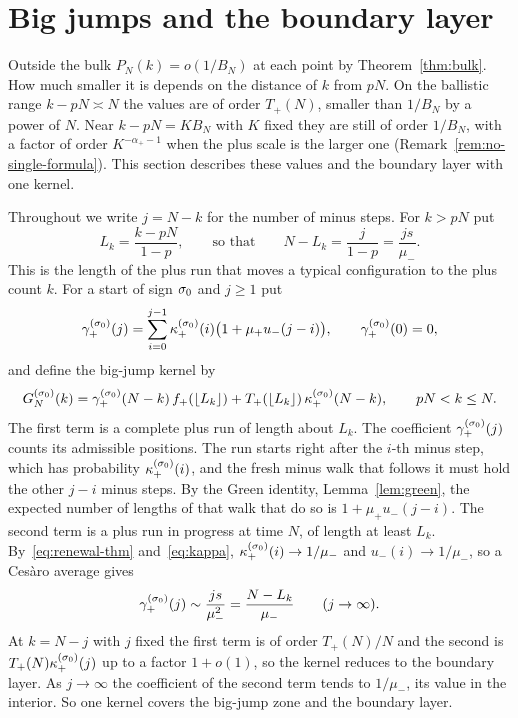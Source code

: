 \section{Big jumps and the boundary layer}\label{sec:bigjump}

Outside the bulk $P_N(k)=o(1/B_N)$ at each point by Theorem~\ref{thm:bulk}. How
much smaller it is depends on the distance of $k$ from $pN$. On the ballistic
range $k-pN\asymp N$ the values are of order $T_\plus(N)$, smaller than $1/B_N$
by a power of $N$. Near $k-pN=KB_N$ with $K$ fixed they are still of order
$1/B_N$, with a factor of order $K^{-\alpha_\plus-1}$ when the plus scale is the
larger one (Remark~\ref{rem:no-single-formula}). This section describes these
values and the
boundary layer with one kernel.

Throughout we write $j=N-k$ for the number of minus steps. For $k>pN$ put
\begin{equation}\label{eq:Lk}
 L_k=\frac{k-pN}{1-p},\qquad\text{so that}\qquad N-L_k=\frac{j}{1-p}=\frac{js}{\mu_\minus}.
\end{equation}
This is the length of the plus run that moves a typical configuration to the
plus count $k$. For a start of sign $\sigma_0$ and $j\ge1$ put
\begin{equation}\label{eq:gamma}
 \gamma^{(\sigma_0)}_{+}(j)=\sum_{i=0}^{j-1}\kappa^{(\sigma_0)}_{+}(i)\bigl(1+\mu_{+} u_{-}(j-i)\bigr),
 \qquad\gamma^{(\sigma_0)}_{+}(0)=0,
\end{equation}
and define the big-jump kernel by
\begin{equation}\label{eq:G}
 G^{(\sigma_0)}_N(k)=\gamma^{(\sigma_0)}_{+}(N-k)\,f_{+}(\lfloor L_k\rfloor)
 +T_{+}(\lfloor L_k\rfloor)\,\kappa^{(\sigma_0)}_{+}(N-k),\qquad pN<k\le N .
\end{equation}
The first term is a complete plus run of length about $L_k$. The coefficient
$\gamma^{(\sigma_0)}_{+}(j)$ counts its admissible positions. The run starts right
after the $i$-th minus step, which has probability $\kappa^{(\sigma_0)}_{+}(i)$, and
the fresh minus walk that follows it must hold the other $j-i$ minus steps. By the
Green identity, Lemma~\ref{lem:green}, the expected number of lengths of that walk
that do so is $1+\mu_\plus u_\minus(j-i)$. The second term is a plus run in
progress at time $N$, of length at least $L_k$. By~\eqref{eq:renewal-thm} and~\eqref{eq:kappa},
$\kappa^{(\sigma_0)}_{+}(i)\to1/\mu_{-}$ and $u_\minus(i)\to1/\mu_\minus$, so a
Ces\`aro average gives
\begin{equation}\label{eq:gamma-asymp}
 \gamma^{(\sigma_0)}_{+}(j)\sim\frac{js}{\mu_{-}^2}=\frac{N-L_k}{\mu_{-}}\qquad(j\to\infty).
\end{equation}
At $k=N-j$ with $j$ fixed the first term is of order $T_\plus(N)/N$ and the
second is $T_{+}(N)\kappa^{(\sigma_0)}_{+}(j)$ up to a factor $1+o(1)$, so the
kernel reduces to the boundary layer. As $j\to\infty$ the coefficient of the
second term tends to $1/\mu_\minus$, its value in the interior. So one kernel
covers the big-jump zone and the boundary layer.

